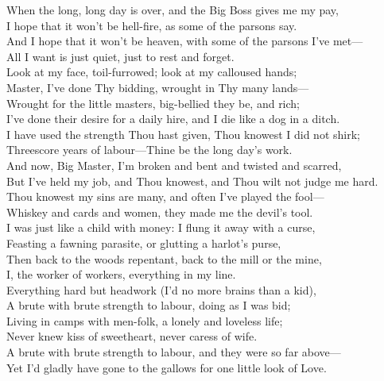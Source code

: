

\begin{poemblock}
When the long, long day is over, and the Big Boss gives me my pay,\\
I hope that it won't be hell-fire, as some of the parsons say.\\
And I hope that it won't be heaven, with some of the parsons I've met—\\
All I want is just quiet, just to rest and forget.\\
Look at my face, toil-furrowed; look at my calloused hands;\\
Master, I've done Thy bidding, wrought in Thy many lands—\\
Wrought for the little masters, big-bellied they be, and rich;\\
I've done their desire for a daily hire, and I die like a dog in a ditch.\\
I have used the strength Thou hast given, Thou knowest I did not shirk;\\
Threescore years of labour—Thine be the long day's work.\\
And now, Big Master, I'm broken and bent and twisted and scarred,\\
But I've held my job, and Thou knowest, and Thou wilt not judge me hard.\\
Thou knowest my sins are many, and often I've played the fool—\\
Whiskey and cards and women, they made me the devil's tool.\\
I was just like a child with money: I flung it away with a curse,\\
Feasting a fawning parasite, or glutting a harlot's purse,\\
Then back to the woods repentant, back to the mill or the mine,\\
I, the worker of workers, everything in my line.\\
Everything hard but headwork (I'd no more brains than a kid),\\
A brute with brute strength to labour, doing as I was bid;\\
Living in camps with men-folk, a lonely and loveless life;\\
Never knew kiss of sweetheart, never caress of wife.\\
A brute with brute strength to labour, and they were so far above—\\
Yet I'd gladly have gone to the gallows for one little look of Love.\\

\end{poemblock}

